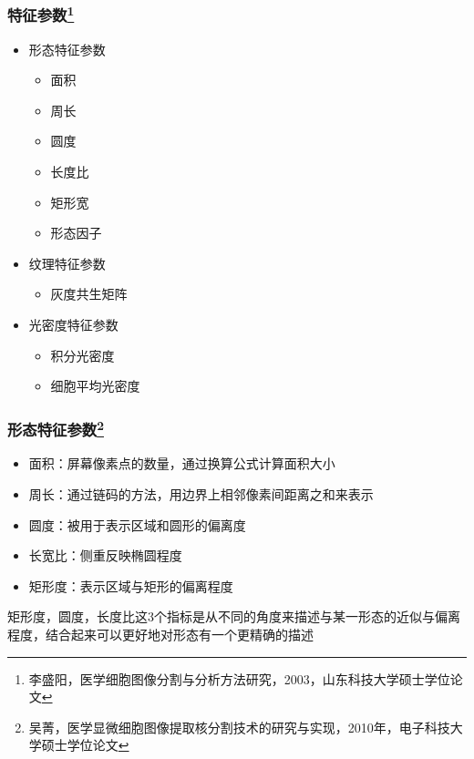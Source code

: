 \documentclass[notheorems,mathserif,table,compress]{beamer}  %
\begin{document}
\begin{frame}
  \frametitle{特征参数\footnote{李盛阳，医学细胞图像分割与分析方法研究，2003，山东科技大学硕士学位论文}}
   \begin{itemize}
   \item 形态特征参数
         \begin{itemize}
         \item 面积
         \item 周长
         \item 圆度
         \item 长度比
         \item 矩形宽
         \item 形态因子
         \end{itemize}
   \item 纹理特征参数
         \begin{itemize}
         \item 灰度共生矩阵
         \end{itemize} 
   \item 光密度特征参数
         \begin{itemize}
         \item 积分光密度
         \item 细胞平均光密度
         \end{itemize}             
   \end{itemize}
\end{frame}


\begin{frame}
  \frametitle{形态特征参数\footnote{吴菁，医学显微细胞图像提取核分割技术的研究与实现，2010年，电子科技大学硕士学位论文}}
   \begin{itemize}
   \item 面积：屏幕像素点的数量，通过换算公式计算面积大小
   \item 周长：通过链码的方法，用边界上相邻像素间距离之和来表示
   \item 圆度：被用于表示区域和圆形的偏离度
   \item 长宽比：侧重反映椭圆程度
   \item 矩形度：表示区域与矩形的偏离程度\newline
   \end{itemize}
   \hspace{0.3in}矩形度，圆度，长度比这3个指标是从不同的角度来描述与某一形态的近似与偏离程度，结合起来可以更好地对形态有一个更精确的描述
\end{frame}
\end{document}
